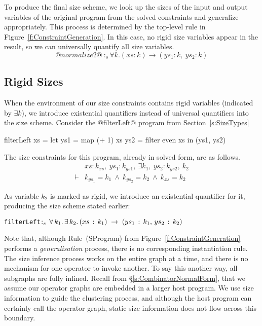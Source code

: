 To produce the final size scheme, we look up the sizes of the input and output variables of the original program from the solved constraints and generalize appropriately. This process is determined by the top-level rule in Figure~\ref{f:ConstraintGeneration}. In this case, no rigid size variables appear in the result, so we can universally quantify all size variables.
$$@normalize2@ ~:_s \forall k. (xs : k) \to (ys_1 : k,~ ys_2 : k)
$$




\subsection{Rigid Sizes}
When the environment of our size constraints contains rigid variables (indicated by $\exists k$), we introduce existential quantifiers instead of universal quantifiers into the size scheme. Consider the @filterLeft@ program from Section~\ref{s:SizeTypes}
\begin{code}
      filterLeft xs
        = let ys1 = map (+ 1)   xs
              ys2 = filter even xs
          in (ys1, ys2)
\end{code}

The size constraints for this program, already in solved form, are as follows.
$$
\begin{array}{ll}
       & xs : k_{xs},~ ys_1 : k_{ys1},~ \exists k_1,~ ys_2 : k_{ys2},~ k_2
\\
\vdash &          k_{ys_1} = k_1
        ~\wedge~  k_{ys_2} = k_2
        ~\wedge~  k_{xs}   = k_2
\end{array}
$$

As variable $k_2$ is marked as rigid, we introduce an existential quantifier for it, producing the size scheme stated earlier:

\begin{alltt}
   filterLeft \(:\sb{s}\,\forall\,k\sb{1}.\,\exists\,k\sb{2}.\,(xs\,:\,k\sb{1})\;\to\;(ys\sb{1}\,:\,k\sb{1},\,ys\sb{2}\,:\,k\sb{2})\)
\end{alltt}

Note that, although Rule~(SProgram) from Figure~\ref{f:ConstraintGeneration} performs a \emph{generalisation} process, there is no corresponding instantiation rule. The size inference process works on the entire graph at a time, and there is no mechanism for one operator to invoke another. To say this another way, all subgraphs are fully inlined. Recall from \S\ref{s:CombinatorNormalForm}, that we assume our operator graphs are embedded in a larger host program. We use size information to guide the clustering process, and although the host program can certainly call the operator graph, static size information does not flow across this boundary.

